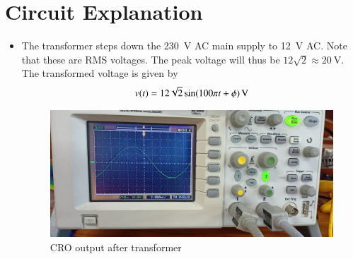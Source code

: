 \documentclass[journal,12pt,twocolumn]{IEEEtran}
\numberwithin{equation}{section}
\numberwithin{figure}{section}
\begin{document}
	\section{Circuit Explanation}
	\begin{itemize}
	\item The transformer steps down the \SI{230}{\volt} AC main supply to \SI{12}{\volt} AC. Note that these are RMS voltages. The peak voltage will thus be $12\sqrt{2} \approx \SI{20}{\volt}$. The transformed voltage is given by
	\begin{align}
		v(t) = \SI[parse-numbers=false]{12\sqrt{2}\sin(100\pi t + \phi)}{\volt}
	\end{align}
	\begin{figure}[!ht]
		\centering
		\includegraphics[width=\columnwidth]{./figs/transformer.jpg}
		\caption{CRO output after transformer}
		\label{fig-transformer}	
	\end{figure}
	

\end{itemize}
\end{document}
